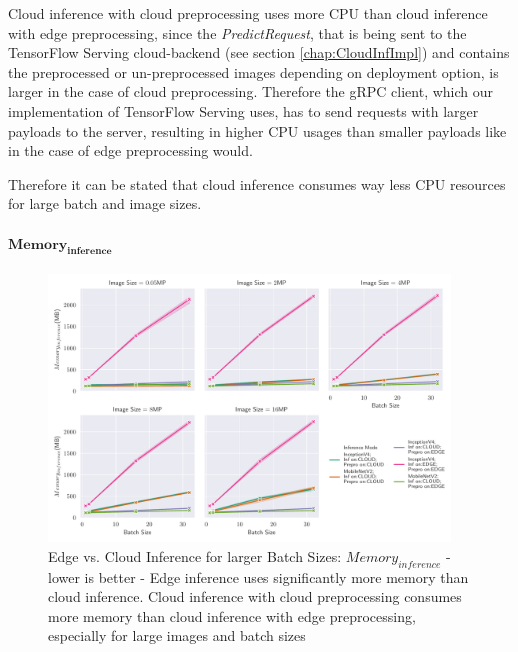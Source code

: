 Cloud inference with cloud preprocessing uses more CPU than cloud inference with edge preprocessing, since the \emph{PredictRequest}, that is being sent to the TensorFlow Serving cloud-backend (see section \ref{chap:CloudInfImpl}) and contains the preprocessed or un-preprocessed images depending on deployment option, is larger in the case of cloud preprocessing.
Therefore the gRPC client, which our implementation of TensorFlow Serving uses, has to send requests with larger payloads to the server, resulting in higher CPU usages than smaller payloads like in the case of edge preprocessing would.


Therefore it can be stated that cloud inference consumes way less CPU resources for large batch and image sizes.



\paragraph{$\mathbf{Memory_{inference}}$}


\begin{figure}[!htb]
\centering
\includegraphics[width=0.95\textwidth]{./Bilder/single_plots/batch_size_plots/Effects_of_Batch_size_Inference_Memory.pdf}
\caption[Edge vs. Cloud Inference for larger Batch Sizes:  $Memory_{inference}$ - lower is better]{Edge vs. Cloud Inference for larger Batch Sizes:  $Memory_{inference}$ - lower is better - Edge inference uses significantly more memory than cloud inference. Cloud inference with cloud preprocessing consumes more memory than cloud inference with edge preprocessing, especially for large images and batch sizes}
\label{fig:BatchSizeInferenceMemory}
\end{figure}

